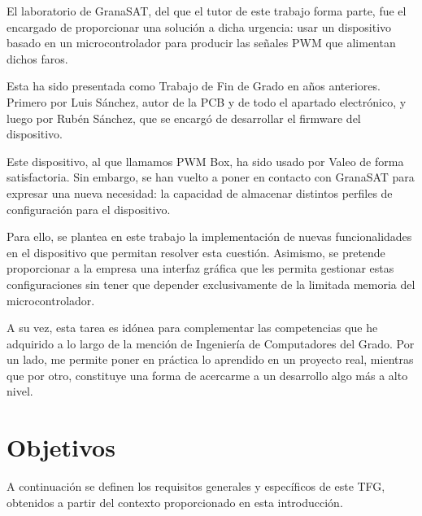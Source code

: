 El laboratorio de GranaSAT, del que el tutor de este trabajo forma parte, fue el encargado de proporcionar una solución a dicha urgencia: usar un dispositivo basado en un microcontrolador para producir las señales PWM que alimentan dichos faros.

Esta ha sido presentada como Trabajo de Fin de Grado en años anteriores. Primero por Luis Sánchez, autor de la PCB y de todo el apartado electrónico, y luego por Rubén Sánchez, que se encargó de desarrollar el firmware del dispositivo.

Este dispositivo, al que llamamos PWM Box, ha sido usado por Valeo de forma satisfactoria. Sin embargo, se han vuelto a poner en contacto con GranaSAT para expresar una nueva necesidad: la capacidad de almacenar distintos perfiles de configuración para el dispositivo.

Para ello, se plantea en este trabajo la implementación de nuevas funcionalidades en el dispositivo que permitan resolver esta cuestión. Asimismo, se pretende proporcionar a la empresa una interfaz gráfica que les permita gestionar estas configuraciones sin tener que depender exclusivamente de la limitada memoria del microcontrolador.

A su vez, esta tarea es idónea para complementar las competencias que he adquirido a lo largo de la mención de Ingeniería de Computadores del Grado. Por un lado, me permite poner en práctica lo aprendido en un proyecto real, mientras que por otro, constituye una forma de acercarme a un desarrollo algo más a alto nivel.

\section{Objetivos}
\label{sec:objetivos}

A continuación se definen los requisitos generales y específicos de este TFG, obtenidos a partir del contexto proporcionado en esta introducción.

